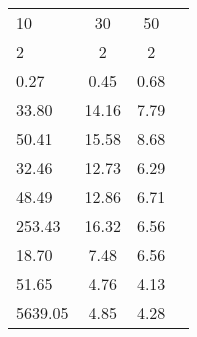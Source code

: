 \begin{tabular}{l|c|c|c|}
\toprule
      10 &     30 &    50 \\
       2 &      2 &     2 \\
\midrule
    0.27 &   0.45 &  0.68 \\
   33.80 &  14.16 &  7.79 \\
   50.41 &  15.58 &  8.68 \\
   \cellcolor{\secondcolor} 32.46 &  12.73 &  6.29 \\
   48.49 &  12.86 &  6.71 \\
  253.43 &  16.32 &  6.56 \\
   \cellcolor{\firstcolor} 18.70 &   7.48 &  6.56 \\
   51.65 &   \cellcolor{\firstcolor} 4.76 &  \cellcolor{\firstcolor} 4.13 \\
 5639.05 &   \cellcolor{\secondcolor} 4.85 &  \cellcolor{\secondcolor} 4.28 \\
\bottomrule
\end{tabular}
